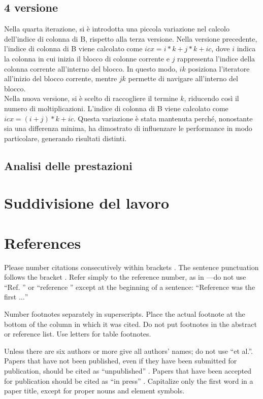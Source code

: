 \documentclass[conference]{IEEEtran}
\begin{document}
\subsection{4 versione}
Nella quarta iterazione, si è introdotta una piccola variazione nel calcolo dell'indice di colonna di B, rispetto alla terza versione. Nella versione precedente, l'indice di colonna di B viene calcolato come $icx = i * k + j * k + ic$, dove $i$ indica la colonna in cui inizia il blocco di colonne corrente e $j$ rappresenta l'indice della colonna corrente all'interno del blocco. In questo modo, $ik$ posiziona l'iteratore all'inizio del blocco corrente, mentre $jk$ permette di navigare all'interno del blocco. \\ Nella nuova versione, si è scelto di raccogliere il termine $k$, riducendo così il numero di moltiplicazioni. L'indice di colonna di B viene calcolato come $icx = (i + j) * k + ic$. Questa variazione è stata mantenuta perché, nonostante sia una differenza minima, ha dimostrato di influenzare le performance in modo particolare, generando risultati distinti.
\subsection{Analisi delle prestazioni}
\section{Suddivisione del lavoro}
\section*{References}

Please number citations consecutively within brackets \cite{b1}. The 
sentence punctuation follows the bracket \cite{b2}. Refer simply to the reference 
number, as in \cite{b3}---do not use ``Ref. \cite{b3}'' or ``reference \cite{b3}'' except at 
the beginning of a sentence: ``Reference \cite{b3} was the first $\ldots$''

Number footnotes separately in superscripts. Place the actual footnote at 
the bottom of the column in which it was cited. Do not put footnotes in the 
abstract or reference list. Use letters for table footnotes.

Unless there are six authors or more give all authors' names; do not use 
``et al.''. Papers that have not been published, even if they have been 
submitted for publication, should be cited as ``unpublished'' \cite{b4}. Papers 
that have been accepted for publication should be cited as ``in press'' \cite{b5}. 
Capitalize only the first word in a paper title, except for proper nouns and 
element symbols.
\end{document}
